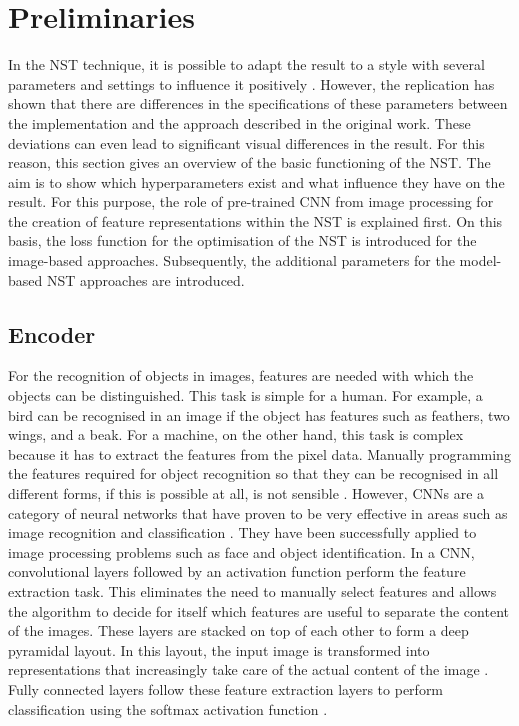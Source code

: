 \section{Preliminaries} \label{sec:preliminaries}
In the \gls{NST} technique, it is possible to adapt the result to a style with several parameters and settings to influence it positively \cite{GEB2016}. However, the replication has shown that there are differences in the specifications of these parameters between the implementation and the approach described in the original work. These deviations can even lead to significant visual differences in the result. For this reason, this section gives an overview of the basic functioning of the \gls{NST}. The aim is to show which hyperparameters exist and what influence they have on the result. For this purpose, the role of pre-trained \gls{CNN} from image processing for the creation of feature representations within the \gls{NST} is explained first. On this basis, the loss function for the optimisation of the \gls{NST} is introduced for the image-based approaches. Subsequently, the additional parameters for the model-based \gls{NST} approaches are introduced. 

\subsection{Encoder} \label{sec:encoder}
For the recognition of objects in images, features are needed with which the objects can be distinguished. This task is simple for a human. For example, a bird can be recognised in an image if the object has features such as feathers, two wings, and a beak. For a machine, on the other hand, this task is complex because it has to extract the features from the pixel data. Manually programming the features required for object recognition so that they can be recognised in all different forms, if this is possible at all, is not sensible \cite{Alp2020}. However, \glspl{CNN} are a category of neural networks that have proven to be very effective in areas such as image recognition and classification \cite{SZ2015,He2016}. They have been successfully applied to image processing problems such as face and object identification. In a \gls{CNN}, convolutional layers followed by an activation function perform the feature extraction task. This eliminates the need to manually select features and allows the algorithm to decide for itself which features are useful to separate the content of the images. These layers are stacked on top of each other to form a deep pyramidal layout. In this layout, the input image is transformed into representations that increasingly take care of the actual content of the image \cite{ZF2014}. Fully connected layers follow these feature extraction layers to perform classification using the softmax activation function \cite{Alp2020}. 

